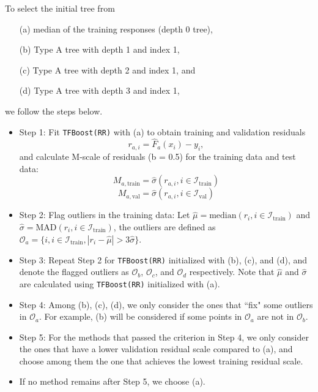 \documentclass{article}
\begin{document}
\begin{itemize}
To  select the initial tree from 
    \begin{enumerate}
        \item[(a)] median of the training responses (depth 0 tree),
        \item[(b)] Type A tree with depth 1 and index 1,
        \item[(c)]  Type A tree with depth 2 and index 1, and
        \item[(d)] Type A tree with depth 3 and index 1,
    \end{enumerate}
    we follow the steps below. 
    \begin{itemize}
        \item Step 1: Fit \texttt{TFBoost(RR)} with (a) to obtain training and validation residuals $$r_{a,i} = \hat{F}_a(x_i) - y_i,$$
       and calculate M-scale of residuals (b = 0.5) for the training data and test data:
        $$M_{a, \text{train}}= \hat{\sigma}(r_{a,i}, i \in \mathcal{I}_{\text{train}})$$
    $$M_{a, \text{val}}= \hat{\sigma}(r_{a,i}, i \in \mathcal{I}_{\text{val}})$$
    \item Step 2: Flag outliers in the training data: 
    Let $\hat{\mu} = \text{median}(r_i, i \in \mathcal{I}_{\text{train}})$ and  $\hat{\sigma} = \text{MAD}(r_i, i \in \mathcal{I}_{\text{train}})$, the outliers are defined as
    $\mathcal{O}_a = \{i, i \in \mathcal{I}_{\text{train}}, |r_i - \hat{\mu}| > 3\hat{\sigma} \}$. 
        \item Step 3: Repeat Step 2 for \texttt{TFBoost(RR)} initialized with (b), (c), and (d), and denote the flagged outliers as  $\mathcal{O}_b$, $\mathcal{O}_c$, and $\mathcal{O}_d$ respectively.  Note that $\hat{\mu}$ and $\hat{\sigma}$ are calculated using \texttt{TFBoost(RR)} initialized with (a). 
        \item Step 4: Among (b), (c), (d), we only consider the ones that  ``fix" some outliers in $\mathcal{O}_a$. For example, (b) will be considered if some points in $\mathcal{O}_a$ are not in $\mathcal{O}_b$. 
        \item Step 5: For the  methods that passed the criterion in Step 4, we only consider the ones that have a lower validation residual scale compared to (a), and choose among them the one that 
        achieves the lowest training residual scale. 
        \item If no method remains after Step 5, we choose (a). 
    \end{itemize}
\end{itemize}
\end{document}
